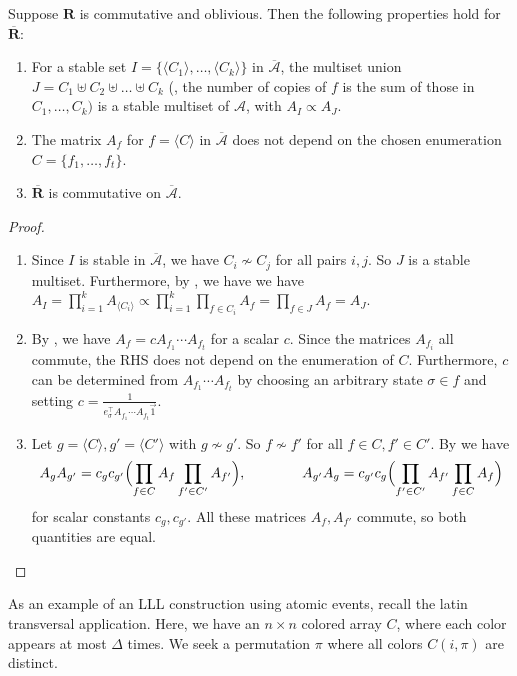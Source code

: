 \documentclass{toc}
\newcommand\oa{\overline{\mathcal A}}
\newcommand\obr{\overline{\mathbf R}}
\begin{document}
  \begin{theorem}
  \label{obl-p2}
  Suppose  $\mathbf R$ is commutative and oblivious. Then the following properties hold for $\obr$:
  \begin{enumerate}
  \item For a stable set $I = \{ \langle C_1 \rangle, \dots, \langle C_k \rangle \}$ in $\oa$, the multiset union $J = C_1 \uplus C_2 \uplus \dots \uplus C_k$ (\ie, the number of copies of $f$ is the sum of those in $C_1, \dots, C_k)$ is a stable multiset of $\mathcal A$, with $A_I \propto A_J$. 
  \item The matrix $A_f$ for $f = \langle C \rangle$  in $\oa$ does not depend on the chosen enumeration $C = \{ f_1, \dots, f_t \}$.  
  \item $\overline{\mathbf R}$ is commutative on $\oa$.
  \end{enumerate}
\end{theorem}
\begin{proof}
\begin{enumerate}
\item  Since $I$ is stable in $\oa$, we have $C_i \not \sim C_j$ for all pairs $i,j$. So $J$ is a stable multiset. Furthermore, by , we have we have 
%
$A_I = \prod_{i=1}^k A_{\langle C_i \rangle} \propto  \prod_{i=1}^k \prod_{f \in C_i} A_f = \prod_{f \in J} A_f = A_J$. %
\item  By , we have $A_f = c A_{f_1} \cdots A_{f_t}$ for a scalar $c$. Since the matrices $A_{f_i}$ all commute, the RHS does not depend on the enumeration of $C$. Furthermore,  $c$ can be determined from $A_{f_1} \cdots A_{f_t}$ by choosing an arbitrary state $\sigma \in f$ and setting $c = \frac{1}{ e_{\sigma}^{\top} A_{f_1} \cdots A_{f_t} \vec 1}$.
\item  Let $g = \langle C \rangle, g' = \langle C' \rangle$ with $g \not \sim g'$. So $f \not \sim f'$ for all $f \in C, f' \in C'$.  By  we have
  $$
  A_g A_{g'} = c_g c_{g'} \Bigl( \prod_{f \in C} A_{f} \prod_{f' \in C'} A_{f'} \Bigr), \qquad \qquad  A_{g'} A_g = c_{g'} c_g  \Bigl(  \prod_{f' \in C'} A_{f'} \prod_{f \in C} A_{f} \Bigr)
  $$
  for scalar constants $c_g, c_{g'}$. All these matrices $A_f, A_{f'}$  commute, so both quantities are equal. \qedhere
  \end{enumerate}
\end{proof}

As an example of an LLL construction using atomic events, recall the latin transversal application. Here, we have an $n \times n$ colored array $C$, where each color appears at most $\Delta$ times. We seek a permutation $\pi$ where all colors $C(i, \pi)$ are distinct.  
  
\end{document}
